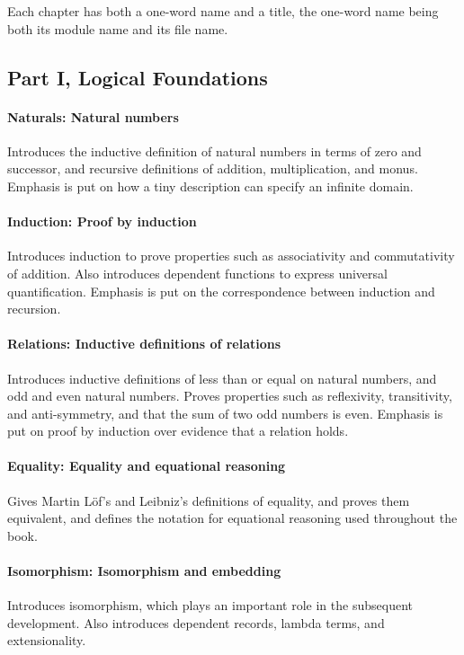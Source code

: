 \documentclass[preprint,authoryear]{elsarticle}
\begin{document}
Each chapter has both a one-word name and a title, the one-word name
being both its module name and its file name.

\subsection*{Part I, Logical Foundations}

\paragraph{Naturals: Natural numbers}
Introduces the inductive definition of natural numbers in terms of
zero and successor, and recursive definitions of addition,
multiplication, and monus. Emphasis is put on how a tiny description
can specify an infinite domain.

\paragraph{Induction: Proof by induction}
Introduces induction to prove properties
such as associativity and commutativity of addition.
Also introduces dependent functions to express universal quantification.
Emphasis is put on the correspondence between induction and recursion.

\paragraph{Relations: Inductive definitions of relations}
Introduces inductive definitions of less than or equal on natural numbers,
and odd and even natural numbers.
Proves properties such as reflexivity, transitivity, and
anti-symmetry, and that the sum of two odd numbers is even.
Emphasis is put on proof by induction over evidence that a relation holds.

\paragraph{Equality: Equality and equational reasoning}
Gives Martin L\"of's and Leibniz's definitions of equality, and proves
them equivalent, and defines the notation for equational reasoning used
throughout the book.

\paragraph{Isomorphism: Isomorphism and embedding}
Introduces isomorphism, which plays an important role in the
subsequent development.  Also introduces dependent records, lambda
terms, and extensionality.
\end{document}
